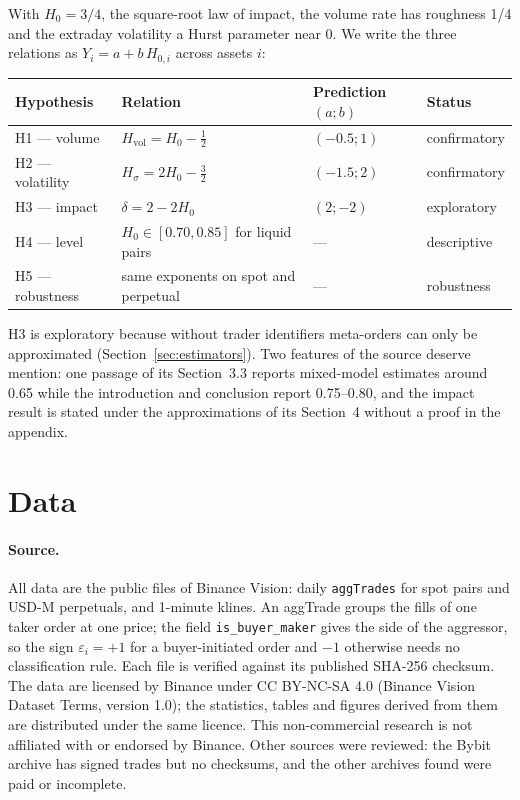 \documentclass[11pt]{article}
\newcommand{\Hz}{H_0}
\newcommand{\Hv}{H_{\mathrm{vol}}}
\newcommand{\Hs}{H_\sigma}
\begin{document}
With $\Hz=3/4$, the square-root law of impact, the volume rate has roughness 1/4 and the
extraday volatility a Hurst parameter near 0. We write the three relations as
$Y_i=a+b\,H_{0,i}$ across assets $i$:
\begin{center}
\begin{tabular}{llll}
\toprule
Hypothesis & Relation & Prediction $(a;b)$ & Status \\
\midrule
H1 --- volume & $\Hv=\Hz-\tfrac12$ & $(-0.5;1)$ & confirmatory \\
H2 --- volatility & $\Hs=2\Hz-\tfrac32$ & $(-1.5;2)$ & confirmatory \\
H3 --- impact & $\delta=2-2\Hz$ & $(2;-2)$ & exploratory \\
H4 --- level & $\Hz\in[0.70,0.85]$ for liquid pairs & --- & descriptive \\
H5 --- robustness & same exponents on spot and perpetual & --- & robustness \\
\bottomrule
\end{tabular}
\end{center}
H3 is exploratory because without trader identifiers meta-orders can only be
approximated (Section~\ref{sec:estimators}). Two features of the source deserve mention:
one passage of its Section~3.3 reports mixed-model estimates around 0.65 while the
introduction and conclusion report 0.75--0.80, and the impact result is stated under the
approximations of its Section~4 without a proof in the appendix.

\section{Data}
\label{sec:data}
\paragraph{Source.} All data are the public files of Binance Vision: daily
\texttt{aggTrades} for spot pairs and USD-M perpetuals, and 1-minute klines. An aggTrade
groups the fills of one taker order at one price; the field \texttt{is\_buyer\_maker} gives
the side of the aggressor, so the sign $\varepsilon_i=+1$ for a buyer-initiated order and
$-1$ otherwise needs no classification rule. Each file is verified against its published
SHA-256 checksum. The data are licensed by Binance under CC BY-NC-SA 4.0 (Binance Vision
Dataset Terms, version 1.0); the statistics, tables and figures derived from them are
distributed under the same licence. This non-commercial research is not affiliated with or
endorsed by Binance. Other sources were reviewed: the Bybit archive has signed trades but no
checksums, and the other archives found were paid or incomplete.
\end{document}
